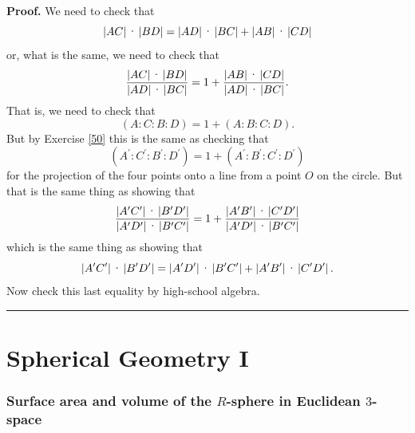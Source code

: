 \documentclass{article}%
\newenvironment{proof}[1][Proof]{\noindent\textbf{#1.} }{\ \rule{0.5em}{0.5em}}
\begin{document}
\begin{proof}
We need to check that%
\[
\left\vert AC\right\vert \text{\textperiodcentered}\left\vert BD\right\vert
=\left\vert AD\right\vert \text{\textperiodcentered}\left\vert BC\right\vert
+\left\vert AB\right\vert \text{\textperiodcentered}\left\vert CD\right\vert
\]
or, what is the same, we need to check that%
\[
\frac{\left\vert AC\right\vert \text{\textperiodcentered}\left\vert
BD\right\vert }{\left\vert AD\right\vert \text{\textperiodcentered}\left\vert
BC\right\vert }=1+\frac{\left\vert AB\right\vert \text{\textperiodcentered
}\left\vert CD\right\vert }{\left\vert AD\right\vert \text{\textperiodcentered
}\left\vert BC\right\vert }.
\]
That is, we need to check that
\[
\left(  A:C:B:D\right)  =1+\left(  A:B:C:D\right)  .
\]
But by Exercise \ref{50} this is the same as checking that%
\[
\left(  A^{\prime}:C^{\prime}:B^{\prime}:D^{\prime}\right)  =1+\left(
A^{\prime}:B^{\prime}:C^{\prime}:D^{\prime}\right)
\]
for the projection of the four points onto a line from a point $O$ on the
circle. But that is the same thing as showing that
\[
\frac{\left\vert A^{\prime}C^{\prime}\right\vert \text{\textperiodcentered
}\left\vert B^{\prime}D^{\prime}\right\vert }{\left\vert A^{\prime}D^{\prime
}\right\vert \text{\textperiodcentered}\left\vert B^{\prime}C^{\prime
}\right\vert }=1+\frac{\left\vert A^{\prime}B^{\prime}\right\vert
\text{\textperiodcentered}\left\vert C^{\prime}D^{\prime}\right\vert
}{\left\vert A^{\prime}D^{\prime}\right\vert \text{\textperiodcentered
}\left\vert B^{\prime}C^{\prime}\right\vert }%
\]
which is the same thing as showing that%
\[
\left\vert A^{\prime}C^{\prime}\right\vert \text{\textperiodcentered
}\left\vert B^{\prime}D^{\prime}\right\vert =\left\vert A^{\prime}D^{\prime
}\right\vert \text{\textperiodcentered}\left\vert B^{\prime}C^{\prime
}\right\vert +\left\vert A^{\prime}B^{\prime}\right\vert
\text{\textperiodcentered}\left\vert C^{\prime}D^{\prime}\right\vert .
\]
Now check this last equality by high-school algebra.
\end{proof}

\pagebreak

\part{Spherical Geometry I}

\section{Surface area and volume of the $R$-sphere in Euclidean $3$-space}
\end{document}
